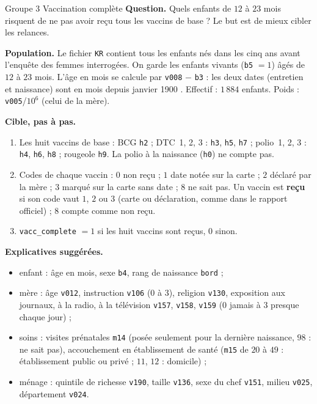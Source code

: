 \documentclass[11pt]{article}
\begin{document}
\begin{fiche}{Groupe 3 \textendash{} Vaccination complète}
\textbf{Question.} Quels enfants de $12$ à $23$ mois risquent de ne pas avoir reçu tous les vaccins de base ? Le but est de mieux cibler les relances.

\textbf{Population.} Le fichier \texttt{KR} contient tous les enfants nés dans les cinq ans avant l'enquête des femmes interrogées. On garde les enfants vivants (\texttt{b5} $=1$) âgés de $12$ à $23$ mois. L'âge en mois se calcule par \texttt{v008} $-$ \texttt{b3} : les deux dates (entretien et naissance) sont en \og mois depuis janvier 1900 \fg{}. Effectif : $1\,884$ enfants. Poids : \texttt{v005}/$10^6$ (celui de la mère).

\textbf{Cible, pas à pas.}
\begin{enumerate}
  \item Les huit vaccins de base : BCG \texttt{h2} ; DTC~1, 2, 3 : \texttt{h3}, \texttt{h5}, \texttt{h7} ; polio~1, 2, 3 : \texttt{h4}, \texttt{h6}, \texttt{h8} ; rougeole \texttt{h9}. La polio à la naissance (\texttt{h0}) ne compte pas.
  \item Codes de chaque vaccin : $0$ non reçu ; $1$ date notée sur la carte ; $2$ déclaré par la mère ; $3$ marqué sur la carte sans date ; $8$ ne sait pas. Un vaccin est \textbf{reçu} si son code vaut $1$, $2$ ou $3$ (carte ou déclaration, comme dans le rapport officiel) ; $8$ compte comme non reçu.
  \item \texttt{vacc\_complete} $=1$ si les huit vaccins sont reçus, $0$ sinon.
\end{enumerate}

\textbf{Explicatives suggérées.}
\begin{itemize}
  \item enfant : âge en mois, sexe \texttt{b4}, rang de naissance \texttt{bord} ;
  \item mère : âge \texttt{v012}, instruction \texttt{v106} ($0$ à $3$), religion \texttt{v130}, exposition aux journaux, à la radio, à la télévision \texttt{v157}, \texttt{v158}, \texttt{v159} ($0$ jamais à $3$ presque chaque jour) ;
  \item soins : visites prénatales \texttt{m14} (posée seulement pour la dernière naissance, $98$ : ne sait pas), accouchement en établissement de santé (\texttt{m15} de $20$ à $49$ : établissement public ou privé ; $11$, $12$ : domicile) ;
  \item ménage : quintile de richesse \texttt{v190}, taille \texttt{v136}, sexe du chef \texttt{v151}, milieu \texttt{v025}, département \texttt{v024}.
\end{itemize}


\end{fiche}
\end{document}
